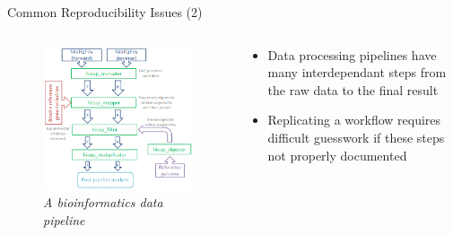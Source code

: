 \documentclass[aspectratio=169, 10pt]{beamer}
\begin{document}
\begin{frame}{Common Reproducibility Issues (2)}
    \begin{columns}
        \begin{column}{0.5\textwidth}  %
            \begin{center}
                \begin{figure}
                    \includegraphics[width=\textwidth]{images/pipeline.png}
                    \caption*{{\sl A bioinformatics data pipeline}}
                \end{figure}
            \end{center}
        \end{column}
        \begin{column}{0.5\textwidth}
            \begin{itemize}
                \item Data processing pipelines have many interdependant steps
                from the raw data to the final result 
                \item Replicating a workflow requires difficult guesswork if these steps not properly documented 
            \end{itemize}
        \end{column}
    \end{columns}
\end{frame}
\end{document}
